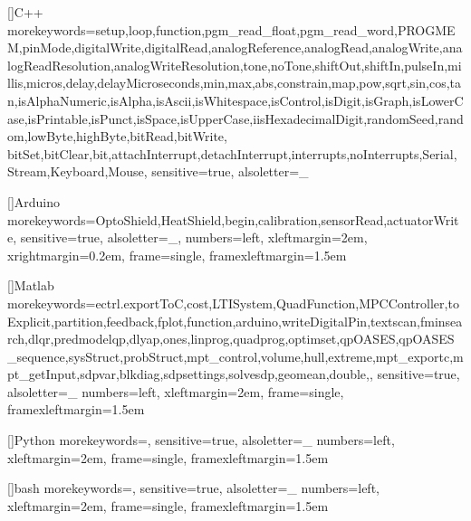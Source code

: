 []{C++}      %
{morekeywords={setup,loop,function,pgm_read_float,pgm_read_word,PROGMEM,pinMode,digitalWrite,digitalRead,analogReference,analogRead,analogWrite,analogReadResolution,analogWriteResolution,tone,noTone,shiftOut,shiftIn,pulseIn,millis,micros,delay,delayMicroseconds,min,max,abs,constrain,map,pow,sqrt,sin,cos,tan,isAlphaNumeric,isAlpha,isAscii,isWhitespace,isControl,isDigit,isGraph,isLowerCase,isPrintable,isPunct,isSpace,isUpperCase,iisHexadecimalDigit,randomSeed,random,lowByte,highByte,bitRead,bitWrite,
bitSet,bitClear,bit,attachInterrupt,detachInterrupt,interrupts,noInterrupts,Serial,Stream,Keyboard,Mouse},
sensitive=true,
alsoletter={_}
}

[]{Arduino}      %
{morekeywords={OptoShield,HeatShield,begin,calibration,sensorRead,actuatorWrite},
sensitive=true,
alsoletter={_},
numbers=left,
xleftmargin=2em,
xrightmargin=0.2em,
frame=single,
framexleftmargin=1.5em
}

[]{Matlab}      {morekeywords={ectrl.exportToC,cost,LTISystem,QuadFunction,MPCController,toExplicit,partition,feedback,fplot,function,arduino,writeDigitalPin,textscan,fminsearch,dlqr,predmodelqp,dlyap,ones,linprog,quadprog,optimset,qpOASES,qpOASES_sequence,sysStruct,probStruct,mpt_control,volume,hull,extreme,mpt_exportc,mpt_getInput,sdpvar,blkdiag,sdpsettings,solvesdp,geomean,double,},
sensitive=true,
alsoletter={_}
numbers=left,
xleftmargin=2em,
frame=single,
framexleftmargin=1.5em
}

[]{Python}
{morekeywords={},
sensitive=true,
alsoletter={_}
numbers=left,
xleftmargin=2em,
frame=single,
framexleftmargin=1.5em}

[]{bash}
{morekeywords={},
sensitive=true,
alsoletter={_}
numbers=left,
xleftmargin=2em,
frame=single,
framexleftmargin=1.5em}



